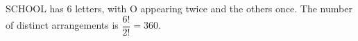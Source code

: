 SCHOOL has $6$ letters, with O appearing twice and the others once. The number of distinct arrangements is $\dfrac{6!}{2!}=\boxed{360}$.
